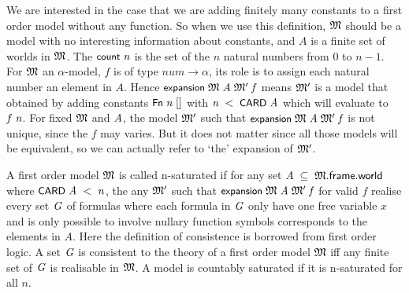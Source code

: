 \documentclass[letterpaper]{article}
\renewcommand{\HOLConst}[1]{{\textsf{\upshape\small #1}}}
\renewcommand{\HOLinline}[1]{\ensuremath{#1}}
\begin{document}
We are interested in the case that we are adding finitely many constants to a first order model without any function. So when we use this definition, \HOLinline{\HOLFreeVar{\ensuremath{\mathfrak{M}}}} should be a model with no interesting information about constants, and $A$ is a finite set of worlds in \HOLinline{\HOLFreeVar{\ensuremath{\mathfrak{M}}}}. The \HOLinline{\HOLConst{count}\;\HOLFreeVar{n}} is the set of the $n$ natural numbers from $0$ to $n-1$. For \HOLinline{\HOLFreeVar{\ensuremath{\mathfrak{M}}}} an $\alpha$-model, $f$ is of type $num\to \alpha$, its role is to assign each natural number an element in $A$. Hence \HOLinline{\HOLConst{expansion}\;\HOLFreeVar{\ensuremath{\mathfrak{M}}}\;\HOLFreeVar{A}\;\HOLFreeVar{\ensuremath{\mathfrak{M}'}}\;\HOLFreeVar{f}} means \HOLinline{\HOLFreeVar{\ensuremath{\mathfrak{M}'}}} is a model that obtained by adding constants \HOLinline{\HOLConst{Fn}\;\HOLFreeVar{n}\;[]} with \HOLinline{\HOLFreeVar{n}\;\HOLSymConst{\HOLTokenLt{}}\;\HOLConst{CARD}\;\HOLFreeVar{A}} which will evaluate to \HOLinline{\HOLFreeVar{f}\;\HOLFreeVar{n}}. For fixed \HOLinline{\HOLFreeVar{\ensuremath{\mathfrak{M}}}} and \HOLinline{\HOLFreeVar{A}}, the model \HOLinline{\HOLFreeVar{\ensuremath{\mathfrak{M}'}}} such that \HOLinline{\HOLConst{expansion}\;\HOLFreeVar{\ensuremath{\mathfrak{M}}}\;\HOLFreeVar{A}\;\HOLFreeVar{\ensuremath{\mathfrak{M}'}}\;\HOLFreeVar{f}} is not unique, since the $f$ may varies. But it does not matter since all those models will be equivalent, so we can actually refer to `the' expansion of \HOLinline{\HOLFreeVar{\ensuremath{\mathfrak{M}'}}}. %

A first order model \HOLinline{\HOLFreeVar{\ensuremath{\mathfrak{M}}}} is called n-saturated if for any set \HOLinline{\HOLFreeVar{A}\;\HOLSymConst{\HOLTokenSubset{}}\;\HOLFreeVar{\ensuremath{\mathfrak{M}}}.\HOLFieldName{frame}.\HOLFieldName{world}} where \HOLinline{\HOLConst{CARD}\;\HOLFreeVar{A}\;\HOLSymConst{\HOLTokenLt{}}\;\HOLFreeVar{n}}, the any \HOLinline{\HOLFreeVar{\ensuremath{\mathfrak{M}'}}} such that \HOLinline{\HOLConst{expansion}\;\HOLFreeVar{\ensuremath{\mathfrak{M}}}\;\HOLFreeVar{A}\;\HOLFreeVar{\ensuremath{\mathfrak{M}'}}\;\HOLFreeVar{f}} for valid $f$ realise every set \HOLinline{\HOLFreeVar{G}} of formulas where each formula in \HOLinline{\HOLFreeVar{G}} only have one free variable $x$ and is only possible to involve nullary function symbols corresponds to the elements in $A$. Here the definition of consistence is borrowed from first order logic. A set \HOLinline{\HOLFreeVar{G}} is consistent to the theory of a first order model \HOLinline{\HOLFreeVar{\ensuremath{\mathfrak{M}}}} iff any finite set of \HOLinline{\HOLFreeVar{G}} is realisable in \HOLinline{\HOLFreeVar{\ensuremath{\mathfrak{M}}}}. A model is countably saturated if it is n-saturated for all $n$.
\end{document}
